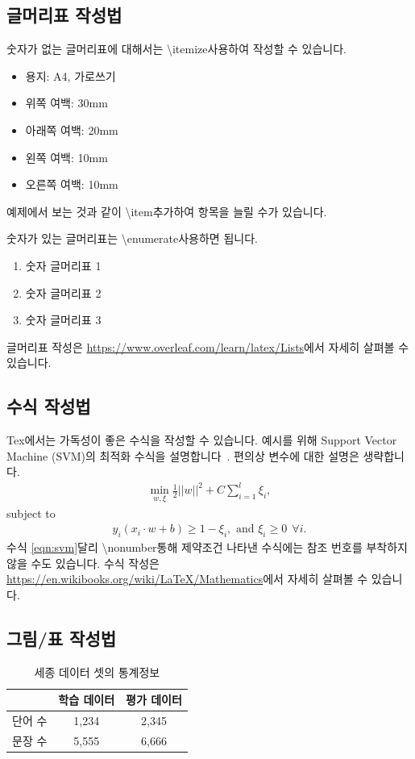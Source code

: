 \documentclass[twocolumn, 10pt]{article}
\begin{document}
\subsection{글머리표 작성법}
숫자가 없는 글머리표에 대해서는 \textbackslash{itemize}\를 사용하여 작성할 수 있습니다.
\begin{itemize}
\item 용지: A4, 가로쓰기
\item 위쪽 여백: 30mm
\item 아래쪽 여백: 20mm
\item 왼쪽 여백: 10mm
\item 오른쪽 여백: 10mm
\end{itemize}
예제에서 보는 것과 같이 \textbackslash{item}\을 추가하여 항목을 늘릴 수가 있습니다.

숫자가 있는 글머리표는 \textbackslash{enumerate}\를 사용하면 됩니다.
\begin{enumerate}
  \item 숫자 글머리표 1
  \item 숫자 글머리표 2
  \item 숫자 글머리표 3
\end{enumerate}

글머리표 작성은 \url{https://www.overleaf.com/learn/latex/Lists}에서 자세히 살펴볼 수 있습니다.

\subsection{수식 작성법}
Tex에서는 가독성이 좋은 수식을 작성할 수 있습니다.
예시를 위해 Support Vector Machine (SVM)의 최적화 수식을 설명합니다~\cite{crammer:jmlr2002}.
편의상 변수에 대한 설명은 생략합니다.
\begin{eqnarray}
\underset{w,\xi}{\min}\frac{1}{2}||w||^2 + C\sum_{i=1}^{l}\xi_i, \label{eqn:svm}
\end{eqnarray}
subject to
\begin{eqnarray}
y_i(x_i \cdot w + b) \ge 1 - \xi_i, \text{ and } \xi_i \ge 0 ~~\forall i.\nonumber
\end{eqnarray}
수식 \eqref{eqn:svm}\와 달리 \textbackslash{nonumber}\을 통해 제약조건 나타낸 수식에는 참조 번호를 부착하지 않을 수도 있습니다.
수식 작성은 \url{https://en.wikibooks.org/wiki/LaTeX/Mathematics}에서 자세히 살펴볼 수 있습니다.

\subsection{그림/표 작성법}
\begin{table}[t]
\caption{세종 데이터 셋의 통계정보}
\label{tab:data_stats}
\begin{center}
\begin{tabular}{c|c|c}
\hline
 & 학습 데이터 & 평가 데이터 \\
\hline
단어 수   & 1,234 & 2,345 \\
문장 수   & 5,555 & 6,666 \\
\hline
\end{tabular}
\end{center}
\end{table}
\end{document}

